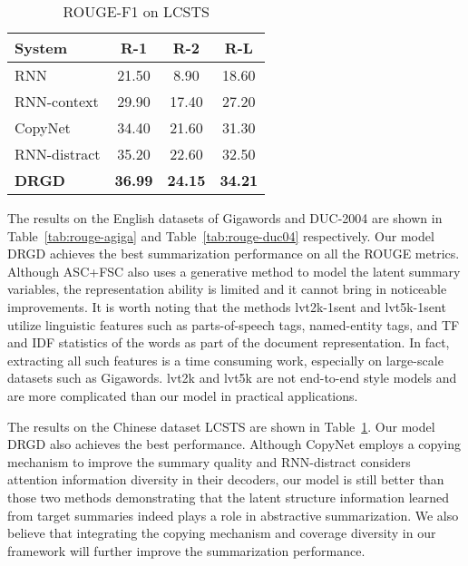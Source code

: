 \documentclass[11pt,letterpaper]{article}
\begin{document}
\begin{table}[!t]
	\centering
	\caption{ROUGE-F1 on LCSTS}
	\label{tab:rouge-lcsts}
	\begin{tabular}{p{2.6cm} c c c}
		\hline
		\textbf{System}  & \textbf{R-1} & \textbf{R-2} & \textbf{R-L} \\
		\hline
		RNN       & 21.50 & 8.90 & 18.60  \\
		RNN-context       & 29.90 & 17.40 & 27.20  \\
		CopyNet       & 34.40 & 21.60 & 31.30  \\
		RNN-distract & 35.20 & 22.60 & 32.50  \\
		\textbf{DRGD}       & \textbf{36.99} & \textbf{24.15} & \textbf{34.21} \\
		\hline
	\end{tabular}
\end{table}

The results on the English datasets of Gigawords and DUC-2004 are shown in Table~\ref{tab:rouge-agiga} and Table~\ref{tab:rouge-duc04} respectively.
Our model DRGD achieves the best summarization performance on all the ROUGE metrics.
Although ASC+FSC also uses a generative method to model the latent summary variables, the representation ability is limited and it cannot bring in noticeable improvements. 
It is worth noting that the methods lvt2k-1sent and lvt5k-1sent \cite{nallapati2016abstractive} utilize linguistic features such as parts-of-speech tags, named-entity tags, and TF and IDF statistics of the words as part of the document representation.
In fact, extracting all such features is a time consuming work, especially on  large-scale datasets such as Gigawords.  lvt2k and lvt5k are not end-to-end style models and are more complicated than our model in practical applications.

The results on the Chinese dataset LCSTS are shown in Table~\ref{tab:rouge-lcsts}.
Our model DRGD also achieves the best performance. Although CopyNet employs a copying mechanism to improve the summary quality and RNN-distract considers attention information diversity in their decoders, our model is still better than those two methods demonstrating that the latent structure information learned from target summaries indeed plays a role in abstractive summarization.
We also believe that integrating the copying mechanism and coverage diversity in our framework will further improve the summarization performance. 
\end{document}
